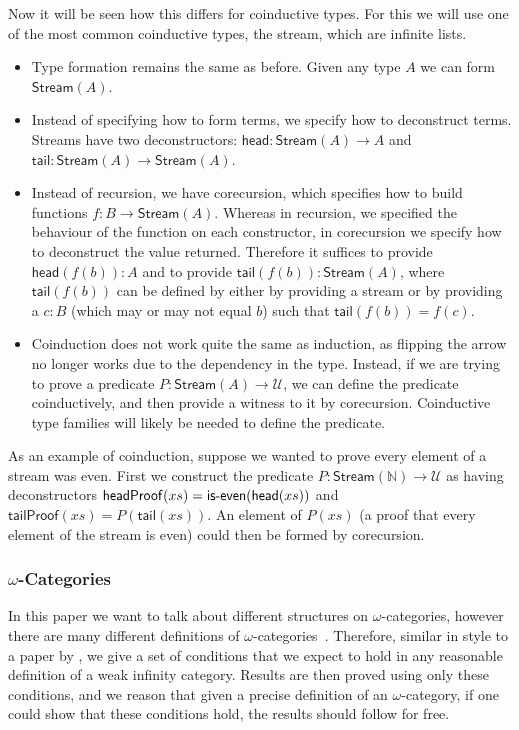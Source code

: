 \documentclass{article}
\begin{document}
Now it will be seen how this differs for coinductive types. For this
we will use one of the most common coinductive types, the stream,
which are infinite lists.

\begin{itemize}
\item Type formation remains the same as before. Given any type \(A\)
  we can form \(\mathsf{Stream}(A)\).
\item Instead of specifying how to form terms, we specify how to
  deconstruct terms. Streams have two deconstructors: \(\mathsf{head}
  : \mathsf{Stream}(A) \to A\) and \(\mathsf{tail} :
  \mathsf{Stream}(A) \to \mathsf{Stream}(A)\).
\item Instead of recursion, we have corecursion, which specifies how
  to build functions \(f : B \to \mathsf{Stream}(A)\). Whereas in recursion, we
  specified the behaviour of the function on each constructor, in
  corecursion we specify how to deconstruct the value returned.
  Therefore it suffices to provide \(\mathsf{head}(f(b)) : A\) and to
  provide \(\mathsf{tail}(f(b)) : \mathsf{Stream}(A)\), where \(\mathsf{tail}(f(b))\) can be defined by either by providing a stream or by providing a \(c : B\) (which may or may not equal \(b\)) such that \(\mathsf{tail}(f(b)) = f(c)\).
\item Coinduction does not work quite the same as induction, as
  flipping the arrow no longer works due to the dependency in the
  type. Instead, if we are trying to prove a predicate \(P :
  \mathsf{Stream}(A) \to \mathcal{U}\), we can define the predicate
  coinductively, and then provide a witness to it by corecursion.
  Coinductive type families will likely be needed to define the
  predicate.
\end{itemize}

As an example of coinduction, suppose we wanted to prove every element
of a stream was even. First we construct the predicate \(P :
\mathsf{Stream}(\mathbb{N}) \to \mathcal{U}\) as having deconstructors
\(\mathsf{headProof}(xs) = \mathsf{is{\text
    -}even}(\mathsf{head}(xs))\) and \(\mathsf{tailProof}(xs) =
P(\mathsf{tail}(xs))\). An element of \(P(xs)\) (a proof that every
element of the stream is even) could then be formed by corecursion.

\subsubsection{\(\omega\)-Categories}\label{sec:categories}

In this paper we want to talk about different structures on
\(\omega\)-categories, however there are many different definitions of
\(\omega\)-categories~\cite{leinster2001survey}. Therefore, similar in style to a
paper by \textcite{Cheng2007}, we give a set of conditions that we
expect to hold in any reasonable definition of a weak infinity
category. Results are then proved using only these conditions, and
we reason that given a precise definition of an \(\omega\)-category, if
one could show that these conditions hold, the results should
follow for free.
\end{document}
